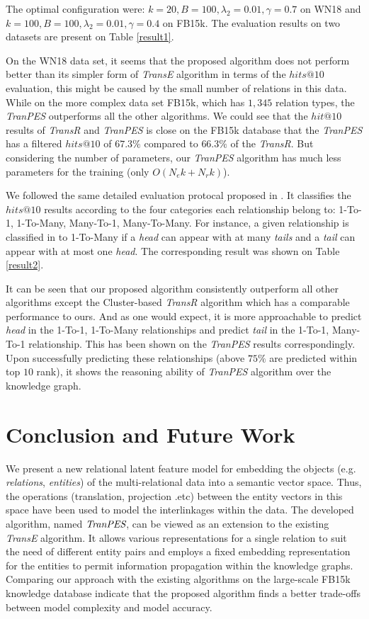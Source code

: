 \documentclass[9pt]{sig-alternate-05-2015}
\begin{document}
The optimal configuration were: $k=20, B = 100, \lambda_2=0.01, \gamma=0.7$ on WN18 and $k=100, B=100, \lambda_2 = 0.01, \gamma=0.4$ on FB15k. The evaluation results on two datasets are present on Table \ref{result1}.

On the WN18 data set, it seems that the proposed algorithm does not perform better than its simpler form of \emph{TransE} algorithm in terms of the $hits@10$ evaluation, this might be caused by the small number of relations in this data. While on the more complex data set FB15k, which has $1,345$  relation types, the \emph{TranPES} outperforms all the other algorithms.  We could see that the $hit@10$ results of \emph{TransR} and \emph{TranPES} is close on the FB15k database that the \emph{TranPES} has a filtered $hits@10$ of $67.3\%$ compared to $66.3\%$ of the \emph{TransR}.   But  considering the number of parameters, our \emph{TranPES} algorithm has much less parameters for the training (only $O(N_ek+N_rk)$).

We followed the same detailed evaluation protocal proposed in \cite{bordes_translating_2013}. It classifies the $hits@10$ results according to the four categories each relationship belong to:  1-To-1, 1-To-Many, Many-To-1, Many-To-Many. For instance, a given relationship is classified in to 1-To-Many if a \emph{head} can appear with at many \emph{tails} and a \emph{tail} can appear with at most one \emph{head}.  The corresponding result was shown on Table \ref{result2}. 

It can be seen that our proposed algorithm consistently outperform all other algorithms except the Cluster-based \emph{TransR} algorithm which has a comparable performance to ours.  And as one would expect, it is more approachable to predict \emph{head} in the 1-To-1, 1-To-Many  relationships and predict \emph{tail} in the 1-To-1, Many-To-1 relationship. This has been shown on the \emph{TranPES} results correspondingly. Upon successfully predicting these relationships (above $75\%$ are predicted within top $10$ rank), it shows the reasoning ability of \emph{TranPES} algorithm over the knowledge graph.




\section{Conclusion and Future Work} \label{conclusion}
We present a new relational latent feature model for embedding the objects (e.g. \emph{relations}, \emph{entities}) of the multi-relational data into a semantic vector space.  Thus, the operations (translation, projection .etc) between the entity vectors in this space have been used to model the interlinkages within the  data. The developed algorithm, named $\emph{TranPES}$, can be viewed as an extension to the existing \emph{TransE} algorithm. It allows various  representations for a single relation to suit the need of different entity pairs and employs a fixed embedding representation for the entities  to permit  information propagation within the knowledge graphs.  Comparing our approach with the existing algorithms on the large-scale FB15k knowledge database indicate that the proposed algorithm finds a better trade-offs between model complexity and model accuracy.
\end{document}

